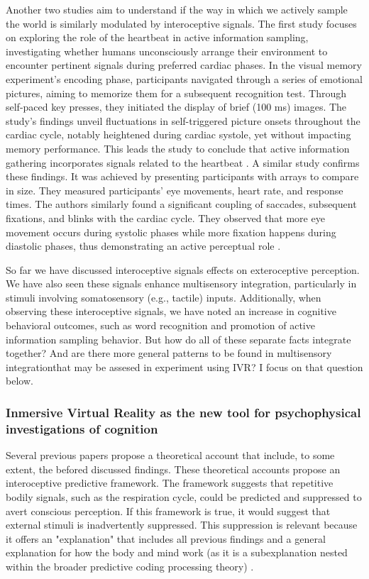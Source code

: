 \documentclass[12pt,oneside,openright]{report}
\begin{document}
Another two studies aim to understand if the way in which we actively sample the world is similarly modulated by interoceptive signals. The first study focuses on exploring the role of the heartbeat in active information sampling, investigating whether humans unconsciously arrange their environment to encounter pertinent signals during preferred cardiac phases. In the visual memory experiment's encoding phase, participants navigated through a series of emotional pictures, aiming to memorize them for a subsequent recognition test. Through self-paced key presses, they initiated the display of brief (100 ms) images. The study's findings unveil fluctuations in self-triggered picture onsets throughout the cardiac cycle, notably heightened during cardiac systole, yet without impacting memory performance. This leads the study to conclude that active information gathering incorporates signals related to the heartbeat \parencite{Kunzendorf2019-vz}. A similar study confirms these findings. It was achieved by presenting participants with arrays to compare in size. They measured participants' eye movements, heart rate, and response times. The authors similarly found a significant coupling of saccades, subsequent fixations, and blinks with the cardiac cycle. They observed that more eye movement occurs during systolic phases while more fixation happens during diastolic phases, thus demonstrating an active perceptual role \parencite{GalvezPol2018ActiveSI}.

So far we have discussed interoceptive signals effects on exteroceptive perception. We have also seen these signals enhance multisensory integration, particularly in stimuli involving somatosensory (e.g., tactile) inputs. Additionally, when observing these interoceptive signals, we have noted an increase in cognitive behavioral outcomes, such as word recognition and promotion of active information sampling behavior. But how do all of these separate facts integrate together? And are there more general patterns to be found in multisensory integrationthat may be assesed in experiment using IVR? I focus on that question below. 

\subsubsection*{Inmersive Virtual Reality as the new tool for psychophysical investigations of cognition}

Several previous papers propose a theoretical account that include, to some extent, the befored discussed findings. These theoretical accounts propose an interoceptive predictive framework. The framework suggests that repetitive bodily signals, such as the respiration cycle, could be predicted and suppressed to avert conscious perception. If this framework is true, it would suggest that external stimuli is inadvertently suppressed. This suppression is relevant because it offers an "explanation" that includes all previous findings and a general explanation for how the body and mind work (as it is a subexplanation nested within the broader predictive coding processing theory) \parencite{AL2021118247, SALTAFOSSI2023108642, Allen2022}.
\end{document}
